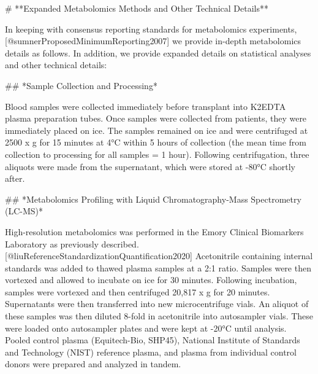 # **Expanded Metabolomics Methods and Other Technical Details**

In keeping with consensus reporting standards for metabolomics experiments,[@sumnerProposedMinimumReporting2007] we provide in-depth metabolomics details as follows. In addition, we provide expanded details on statistical analyses and other technical details:

## *Sample Collection and Processing*

Blood samples were collected immediately before transplant into K2EDTA plasma preparation tubes. Once samples were collected from patients, they were immediately placed on ice. The samples remained on ice and were centrifuged at 2500 x g for 15 minutes at 4°C within 5 hours of collection (the mean time from collection to processing for all samples = 1 hour). Following centrifugation, three aliquots were made from the supernatant, which were stored at -80°C shortly after.

## *Metabolomics Profiling with Liquid Chromatography-Mass Spectrometry (LC-MS)*

High-resolution metabolomics was performed in the Emory Clinical Biomarkers Laboratory as previously described.[@liuReferenceStandardizationQuantification2020] Acetonitrile containing internal standards was added to thawed plasma samples at a 2:1 ratio. Samples were then vortexed and allowed to incubate on ice for 30 minutes. Following incubation, samples were vortexed and then centrifuged 20,817 x g for 20 minutes. Supernatants were then transferred into new microcentrifuge vials. An aliquot of these samples was then diluted 8-fold in acetonitrile into autosampler vials. These were loaded onto autosampler plates and were kept at -20°C until analysis. Pooled control plasma (Equitech-Bio, SHP45), National Institute of Standards and Technology (NIST) reference plasma, and plasma from individual control donors were prepared and analyzed in tandem.


